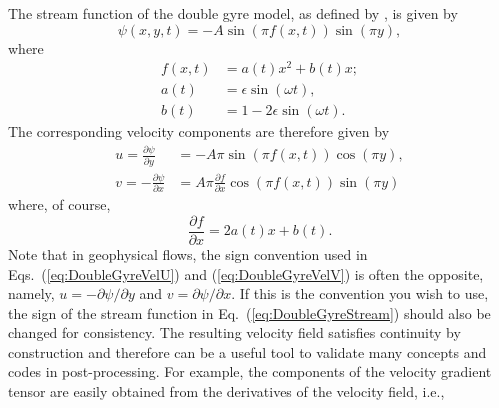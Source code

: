 \documentclass[10pt, twoside]{book}
\begin{document}
			The stream function of the double gyre model, as defined by \citet{Shadden05}, is given by
			\begin{equation}
			\label{eq:DoubleGyreStream}
				\psi\left(x,y,t\right) = -A\sin\left({\pi}f\left(x,t\right)\right)\sin\left({\pi}y\right),
			\end{equation}
			where
			\begin{subequations}
			\label{eq:DoubleGyreStreamDefs}
				\begin{align}
					f\left(x,t\right) &= a\left(t\right)x^2 + b\left(t\right)x;\label{eq:DoubleGyreStreamDefs1}\\
					a\left(t\right)   &= \epsilon\sin\left({\omega}t\right),\label{eq:DoubleGyreStreamDefs2}\\
					b\left(t\right)   &= 1 - 2\epsilon\sin\left({\omega}t\right).\label{eq:DoubleGyreStreamDefs3}
				\end{align}
			\end{subequations}
			The corresponding velocity components are therefore given by
			\begin{subequations}
			\label{eq:DoubleGyreVel}
				\begin{align}
					u = \frac{\partial\psi}{\partial y} &= -A\pi\sin\left({\pi}f\left(x,t\right)\right)\cos\left({\pi}y\right),\label{eq:DoubleGyreVelU}\\
					v = -\frac{\partial\psi}{\partial x} &= A\pi\frac{\partial f}{\partial x}\cos\left({\pi}f\left(x,t\right)\right)\sin\left({\pi}y\right)\label{eq:DoubleGyreVelV}
				\end{align}
			\end{subequations}
			where, of course,
			\begin{equation}
			\label{eq:DoubleGyreStreamdfdx}
				\frac{\partial f}{\partial x} = 2a\left(t\right)x + b\left(t\right).
			\end{equation}
			Note that in geophysical flows, the sign convention used in Eqs.~(\ref{eq:DoubleGyreVelU}) and (\ref{eq:DoubleGyreVelV}) is often the opposite, namely, $u = -\partial\psi/{\partial}y$ and $v = \partial\psi/{\partial}x$. If this is the convention you wish to use, the sign of the stream function in Eq.~(\ref{eq:DoubleGyreStream}) should also be changed for consistency. The resulting velocity field satisfies continuity by construction and therefore can be a useful tool to validate many concepts and codes in post-processing. For example, the components of the velocity gradient tensor are easily obtained from the derivatives of the velocity field, i.e.,
\end{document}
